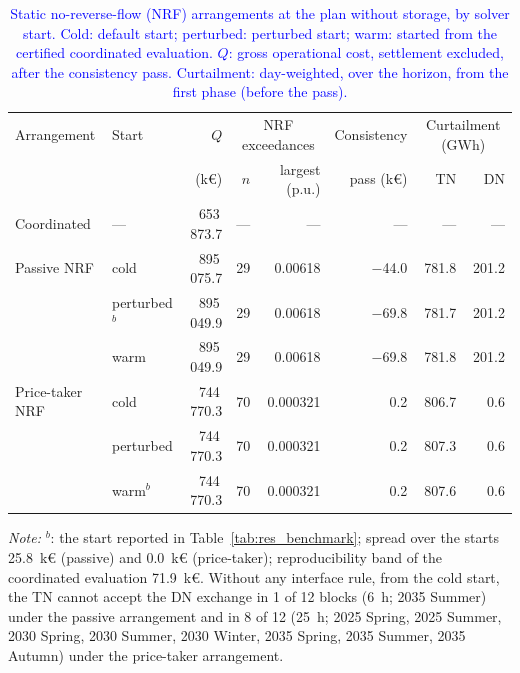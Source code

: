 \begin{table}[htbp!]
    \centering
    \caption{\textcolor{blue}{Static no-reverse-flow (NRF) arrangements at the plan without storage, by solver start. Cold: default start; perturbed: perturbed start; warm: started from the certified coordinated evaluation. $Q$: gross operational cost, settlement excluded, after the consistency pass. Curtailment: day-weighted, over the horizon, from the first phase (before the pass).}}
    \label{tab:appE_benchmark}
    \scriptsize\setlength{\tabcolsep}{4pt}
    \begin{tabular}{l l r r r r r r}
        \toprule
        Arrangement & Start & $Q$ & \multicolumn{2}{c}{NRF exceedances} & Consistency & \multicolumn{2}{c}{Curtailment (GWh)} \\
        \cmidrule(lr){4-5}\cmidrule(l){7-8}
         & & (k\euro) & $n$ & largest (p.u.) & pass (k\euro) & TN & DN \\
        \midrule
        Coordinated & --- & 653\,873.7 & --- & --- & --- & --- & --- \\
        \midrule
        Passive NRF & cold & 895\,075.7 & 29 & 0.00618 & $-$44.0 & 781.8 & 201.2 \\
         & perturbed$^{b}$ & 895\,049.9 & 29 & 0.00618 & $-$69.8 & 781.7 & 201.2 \\
         & warm & 895\,049.9 & 29 & 0.00618 & $-$69.8 & 781.8 & 201.2 \\
        \midrule
        Price-taker NRF & cold & 744\,770.3 & 70 & 0.000321 & 0.2 & 806.7 & 0.6 \\
         & perturbed & 744\,770.3 & 70 & 0.000321 & 0.2 & 807.3 & 0.6 \\
         & warm$^{b}$ & 744\,770.3 & 70 & 0.000321 & 0.2 & 807.6 & 0.6 \\
        \bottomrule
    \end{tabular}
    \par\smallskip
    \begin{minipage}{0.95\linewidth}
        \scriptsize\raggedright
        \textit{Note:} $^{b}$: the start reported in Table~\ref{tab:res_benchmark}; spread over the starts 25.8~k\euro{} (passive) and 0.0~k\euro{} (price-taker); reproducibility band of the coordinated evaluation 71.9~k\euro{}. Without any interface rule, from the cold start, the TN cannot accept the DN exchange in 1 of 12 blocks (6~h; 2035 Summer) under the passive arrangement and in 8 of 12 (25~h; 2025 Spring, 2025 Summer, 2030 Spring, 2030 Summer, 2030 Winter, 2035 Spring, 2035 Summer, 2035 Autumn) under the price-taker arrangement.
    \end{minipage}
\end{table}

